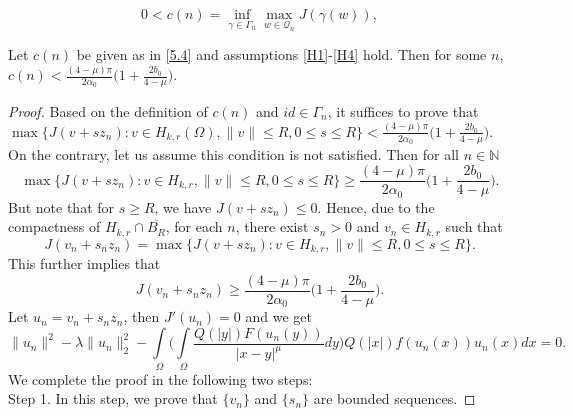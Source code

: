 \documentclass[10pt,a4paper]{amsart}
\begin{document}
	\begin{equation}
		\label{5.4}
		0<c(n) =\inf_{\gamma \in \Gamma_n} \max_{w\in \mathcal Q_n} J(\gamma(w)),
	\end{equation}

	\begin{prop}
		Let $c(n)$ be given as in \eqref{5.4} and assumptions \eqref{H1}-\eqref{H4} hold. Then for some $n$, $c(n)< \frac{(4-\mu)\pi}{2\alpha_0}\Big(1+\frac{2b_0}{4-\mu}\Big).$
	\end{prop}

	\begin{proof}Based on the definition of $c(n)$ and $id\in \Gamma_n$, it suffices to prove that $\max\{ J(v+sz_n): v \in H_{k,r}(\Omega), \|v\| \leq R, 0 \leq s \leq R\} < \frac{(4-\mu)\pi}{2\alpha_0}\Big(1+\frac{2b_0}{4-\mu}\Big)$. 
		On the contrary, let us assume this condition is not satisfied. Then for all $n \in \mathbb{N}$
		\[ \max\{ J(v+sz_n): v\in H_{k,r}, \|v\| \leq R, 0 \leq s \leq R\} \geq \frac{(4-\mu)\pi}{2\alpha_0}\Big(1+\frac{2b_0}{4-\mu}\Big).\]
		But note that for $s \geq R$, we have $J(v+sz_n)\leq0$. Hence, due to the compactness of $H_{k,r} \cap \overline{B_R}$, for each $n$, there exist $s_n>0$ and $v_n \in H_{k,r}$ such that
		\[ J(v_n+s_n z_n) = \max\{ J(v+sz_n): v\in H_{k,r}, \|v\| \leq R, 0 \leq s \leq R\}.\]
		This further implies that
		\begin{equation}
			\label{5.5}
			J(v_n+s_nz_n) \geq \frac{(4-\mu)\pi}{2\alpha_0}\Big(1+\frac{2b_0}{4-\mu}\Big).
		\end{equation}
		Let $u_n = v_n+s_nz_n$, then $J'(u_n)=0$ and we get
		\begin{equation}
			\label{5.6}
			\|u_n\|^2 -\lambda \|u_n\|^2_2 - \int\limits_\Omega \Bigg( \int\limits_\Omega \frac{Q(|y|)F(u_n(y))}{|x-y|^\mu}dy\Bigg) Q(|x|)f(u_n(x))u_n(x)dx =0.
		\end{equation}
		We complete the proof in the following two steps:\\
		Step 1. In this step, we prove that $\{v_n\}$ and $\{s_n\}$ are bounded sequences. 
		

\end{proof}
\end{document}
